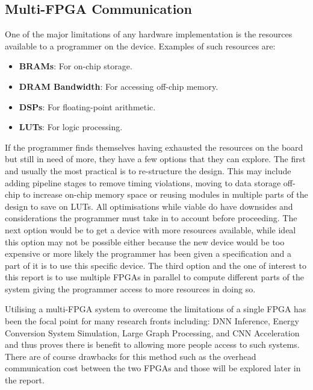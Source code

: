 \subsection{Multi-FPGA Communication}

One of the major limitations of any hardware implementation is the resources available to a programmer on the device. Examples of such resources are:

\begin{itemize}
    \item \textbf{BRAMs}: For on-chip storage.
    \item \textbf{DRAM Bandwidth}: For accessing off-chip memory.
    \item \textbf{DSPs}: For floating-point arithmetic.
    \item \textbf{LUTs}: For logic processing.
\end{itemize}

If the programmer finds themselves having exhausted the resources on the board but still in need of more, they have a few options that they can explore. The first and usually the most practical is to re-structure the design. This may include adding pipeline stages to remove timing violations, moving to data storage off-chip to increase on-chip memory space or reusing modules in multiple parts of the design to save on LUTs. All optimisations while viable do have downsides and considerations the programmer must take in to account before proceeding. The next option would be to get a device with more resources available, while ideal this option may not be possible either because the new device would be too expensive or more likely the programmer has been given a specification and a part of it is to use this specific device. The third option and the one of interest to this report is to use multiple FPGAs in parallel to compute different parts of the system giving the programmer access to more resources in doing so.

Utilising a multi-FPGA system to overcome the limitations of a single FPGA has been the focal point for many research fronts including: DNN Inference\cite{10.1145/3358192}, Energy Conversion System Simulation\cite{8822485}, Large Graph Processing\cite{10.1145/3020078.3021739}, and CNN Acceleration \cite{10.1145/3337821.3337846} and thus proves there is benefit to allowing more people access to such systems. There are of course drawbacks for this method such as the overhead communication cost between the two FPGAs and those will be explored later in the report.

